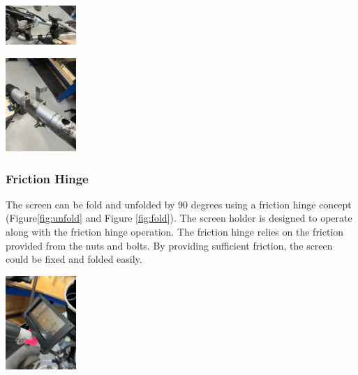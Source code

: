\documentclass[11pt,landscape]{article}
\newenvironment{Figure}
  {\par\medskip\noindent\minipage{\linewidth}}
  {\endminipage\par\medskip}
\begin{document}
\begin{multicols}{3}
    \begin{Figure}
        \begin{center}
            \includegraphics[width=0.2\textwidth]{Figure34.jpg}
            \label{fig:holder}
        \end{center}
    \end{Figure}
    
    \begin{Figure}
        \begin{center}
            \includegraphics[width=0.2\textwidth]{Figure31.jpg}
            \label{fig:rod}
        \end{center}
    \end{Figure}
    
    
    
    \subsubsection{Friction Hinge}
    The screen can be fold and unfolded by 90 degrees using a friction hinge
    concept (Figure\ref{fig:unfold} and Figure \ref{fig:fold}). The screen
    holder is designed to operate along with the friction hinge operation. The
    friction hinge relies on the friction provided from the nuts and bolts. By
    providing sufficient friction, the screen could be fixed and folded easily.
    
    \begin{Figure}
        \begin{center}
            \includegraphics[width=0.2\textwidth]{Figure17.jpg}
            \label{fig:unfold}
        \end{center}
    \end{Figure}
    

\end{multicols}
\end{document}
